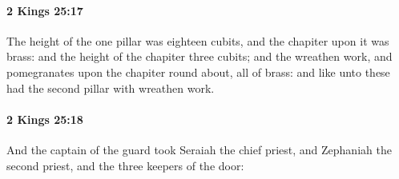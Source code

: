 		\paragraph{2 Kings 25:17} %
			\label{2KINGS-25-17}

			The height of the one pillar was eighteen cubits, and the chapiter upon it was brass: and the height of the chapiter three cubits; and the wreathen work, and pomegranates upon the chapiter round about, all of brass: and like unto these had the second pillar with wreathen work.


		\paragraph{2 Kings 25:18} %
			\label{2KINGS-25-18}

			And the captain of the guard took Seraiah the chief priest, and Zephaniah the second priest, and the three keepers of the door:

